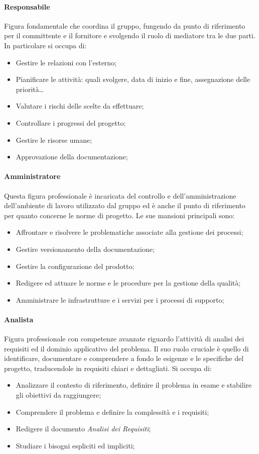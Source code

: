 \documentclass{article}
\begin{document}
\paragraph{Responsabile}\label{responsabile} Figura fondamentale che coordina il gruppo, fungendo da punto di riferimento per il committente e il fornitore e svolgendo il ruolo di mediatore tra le due parti.\\
In particolare si occupa di:
\begin{itemize}
    \item Gestire le relazioni con l'esterno;
    \item Pianificare le attività: quali svolgere, data di inizio e fine, assegnazione delle priorità\dots
    \item Valutare i rischi delle scelte da effettuare;
    \item Controllare i progressi del progetto;
    \item Gestire le risorse umane;
    \item Approvazione della documentazione;
\end{itemize}
\paragraph{Amministratore}\label{amministratore}Questa figura professionale è incaricata del controllo e dell'amministrazione dell'ambiente di lavoro utilizzato dal gruppo ed è anche il punto di riferimento per quanto concerne le norme di progetto. Le sue mansioni principali sono:
\begin{itemize}
    \item Affrontare e risolvere le problematiche associate alla gestione dei processi;
    \item Gestire versionamento della documentazione;
    \item Gestire la configurazione del prodotto;
    \item Redigere ed attuare le norme e le procedure per la gestione della qualità;
    \item Amministrare le infrastrutture e i servizi per i processi di supporto;
\end{itemize}
\paragraph{Analista}\label{analista}Figura professionale con competenze avanzate riguardo l'attività di analisi dei requisiti ed il dominio applicativo del problema. Il suo ruolo cruciale è quello di identificare, documentare e comprendere a fondo le esigenze e le specifiche del progetto, traducendole in requisiti chiari e dettagliati. Si occupa di:
\begin{itemize}
    \item Analizzare il contesto di riferimento, definire il problema in esame e stabilire gli obiettivi da raggiungere;
    \item Comprendere il problema e definire la complessità e i requisiti;
    \item Redigere il documento \textit{Analisi dei Requisiti};
    \item Studiare i bisogni espliciti ed impliciti;
\end{itemize}
\end{document}
